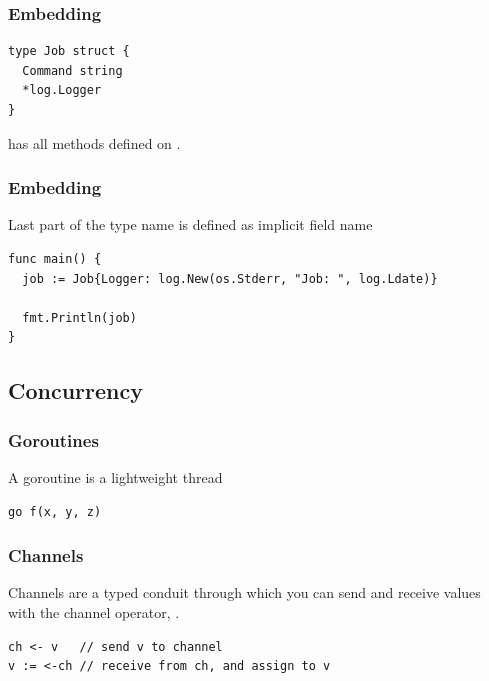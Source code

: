 \documentclass[xetex,mathserif,serif,12pt]{beamer}
\begin{document}
\begin{frame}[fragile]
  \frametitle{Embedding}

  \begin{beamer@nomargin}
    \begin{lstlisting}
type Job struct {
  Command string
  *log.Logger
}
    \end{lstlisting}
  \end{beamer@nomargin}

   has all methods defined on .
\end{frame}

\begin{frame}[fragile]
  \frametitle{Embedding}
  Last part of the type name is defined as implicit field name

  \begin{beamer@nomargin}
    \begin{lstlisting}
func main() {
  job := Job{Logger: log.New(os.Stderr, "Job: ", log.Ldate)}

  fmt.Println(job)
}
    \end{lstlisting}
  \end{beamer@nomargin}
\end{frame}

\subsection{Concurrency}

\begin{frame}[fragile]
  \frametitle{Goroutines}

  A goroutine is a lightweight thread 
  \newline

  \begin{beamer@nomargin}
    \begin{lstlisting}
go f(x, y, z)
    \end{lstlisting}
  \end{beamer@nomargin}

\end{frame}

\begin{frame}[fragile]
  \frametitle{Channels}

  Channels are a typed conduit through which you can send and receive values
  with the channel operator, \hltexttt{<-}.\newline

  \begin{beamer@nomargin}
    \begin{lstlisting}
ch <- v   // send v to channel
v := <-ch // receive from ch, and assign to v
    \end{lstlisting}
  \end{beamer@nomargin}
\end{frame}
\end{document}
